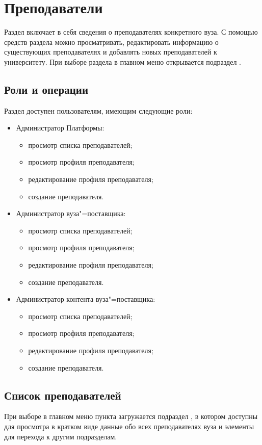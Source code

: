 \graphicspath{{images/instructor/}}

\section{Преподаватели}

Раздел включает в себя сведения о преподавателях конкретного вуза. С помощью средств раздела можно просматривать, редактировать информацию о существующих преподавателях и добавлять новых преподавателей к университету. При выборе раздела в главном меню открывается подраздел .

\subsection{Роли и операции}
Раздел доступен пользователям, имеющим следующие роли:
\begin{itemize}
	\item Администратор Платформы:
	\begin{itemize}
		\item просмотр списка преподавателей;
		\item просмотр профиля преподавателя;
		\item редактирование профиля преподавателя;
		\item создание преподавателя.
	\end{itemize}
	\item Администратор вуза"=поставщика:
	\begin{itemize}
		\item просмотр списка преподавателей;
		\item просмотр профиля преподавателя;
		\item редактирование профиля преподавателя;
		\item создание преподавателя.
	\end{itemize}
	\item Администратор контента вуза"=поставщика:
	\begin{itemize}
		\item просмотр списка преподавателей;
		\item просмотр профиля преподавателя;
		\item редактирование профиля преподавателя;
		\item создание преподавателя.
	\end{itemize}
\end{itemize}

\subsection{Список преподавателей}
При выборе в главном меню пункта  загружается подраздел , в котором доступны для просмотра в кратком виде данные обо всех преподавателях вуза и элементы для перехода к другим подразделам.

